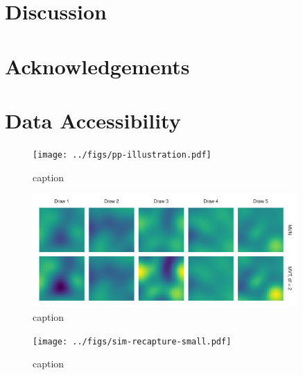 \documentclass[12pt,english]{article}
\begin{document}
\begin{spacing}{1.25}
\section{Discussion}

\section{Acknowledgements}

\section{Data Accessibility}


\begin{figure}[htb]
\begin{center}
  \texttt{[image: ../figs/pp-illustration.pdf]}
\caption{caption}
\label{fig:didactic}
\end{center}
\end{figure}

\begin{figure}[htb]
\begin{center}
  \includegraphics[width=0.9\textwidth]{../figs/nu-rf-illustration.pdf}
\caption{caption}
\label{fig:didactic}
\end{center}
\end{figure}

\begin{figure}[htb]
\begin{center}
  \texttt{[image: ../figs/sim-recapture-small.pdf]}
\caption{caption}
\label{fig:didactic}
\end{center}
\end{figure}


\end{spacing}
\end{document}
